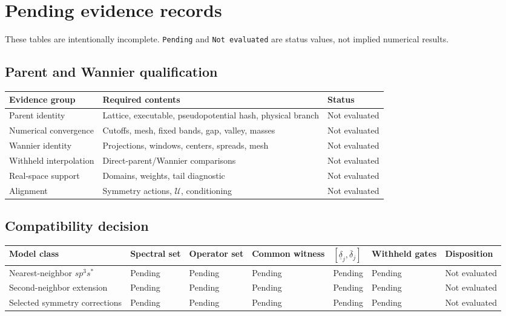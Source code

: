 \documentclass[11pt]{article}
\newenvironment{prospective}{\color{prospectivered}}{}
\begin{document}
\clearpage
\begin{prospective}
\section{Pending evidence records}\label{app:pending}
These tables are intentionally incomplete. \texttt{Pending} and \texttt{Not evaluated} are status values, not implied numerical results.

\subsection{Parent and Wannier qualification}
\begin{center}\small
\begin{tabularx}{\textwidth}{XXX}
\toprule
\textbf{Evidence group} & \textbf{Required contents} & \textbf{Status} \\
\midrule
Parent identity & Lattice, executable, pseudopotential hash, physical branch & Not evaluated \\
Numerical convergence & Cutoffs, mesh, fixed bands, gap, valley, masses & Not evaluated \\
Wannier identity & Projections, windows, centers, spreads, mesh & Not evaluated \\
Withheld interpolation & Direct-parent/Wannier comparisons & Not evaluated \\
Real-space support & Domains, weights, tail diagnostic & Not evaluated \\
Alignment & Symmetry actions, $\mathcal U$, conditioning & Not evaluated \\
\bottomrule
\end{tabularx}
\end{center}
\subsection{Compatibility decision}
\begin{center}\scriptsize\setlength{\tabcolsep}{2pt}
\begin{tabularx}{\textwidth}{XXXXXXX}
\toprule
\textbf{Model class} & \textbf{Spectral set} & \textbf{Operator set} & \textbf{Common witness} & \textbf{$[\underline\delta_j,\overline\delta_j]$} & \textbf{Withheld gates} & \textbf{Disposition} \\
\midrule
Nearest-neighbor $sp^3s^\ast$ & Pending & Pending & Pending & Pending & Pending & Not evaluated \\
Second-neighbor extension & Pending & Pending & Pending & Pending & Pending & Not evaluated \\
Selected symmetry corrections & Pending & Pending & Pending & Pending & Pending & Not evaluated \\
\bottomrule
\end{tabularx}
\end{center}

\end{prospective}
\end{document}
